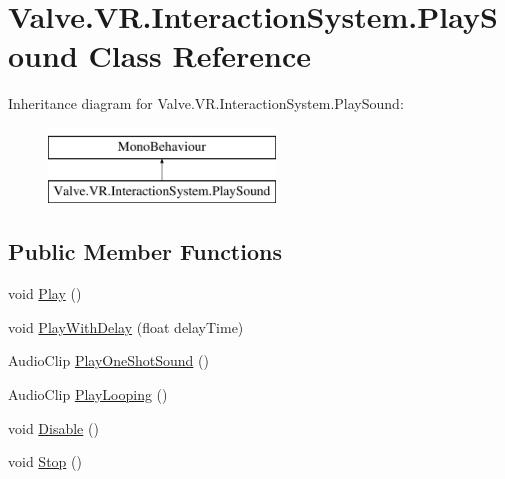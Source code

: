 \hypertarget{class_valve_1_1_v_r_1_1_interaction_system_1_1_play_sound}{}\section{Valve.\+V\+R.\+Interaction\+System.\+Play\+Sound Class Reference}
\label{class_valve_1_1_v_r_1_1_interaction_system_1_1_play_sound}
Inheritance diagram for Valve.\+V\+R.\+Interaction\+System.\+Play\+Sound\+:\begin{figure}[H]
\begin{center}
\leavevmode
\includegraphics[height=2.000000cm]{class_valve_1_1_v_r_1_1_interaction_system_1_1_play_sound}
\end{center}
\end{figure}
\subsection*{Public Member Functions}
\begin{DoxyCompactItemize}
\item 
void \mbox{\hyperlink{class_valve_1_1_v_r_1_1_interaction_system_1_1_play_sound_a90203c161ab7b4151ee3cc5bb3d4dde4}{Play}} ()
\item 
void \mbox{\hyperlink{class_valve_1_1_v_r_1_1_interaction_system_1_1_play_sound_a63a5229219f93d4e2e332ea47e5ba747}{Play\+With\+Delay}} (float delay\+Time)
\item 
Audio\+Clip \mbox{\hyperlink{class_valve_1_1_v_r_1_1_interaction_system_1_1_play_sound_ac8a86c9eb4f69163eb7774b0feeff399}{Play\+One\+Shot\+Sound}} ()
\item 
Audio\+Clip \mbox{\hyperlink{class_valve_1_1_v_r_1_1_interaction_system_1_1_play_sound_abaeb5213c952d970b00917d16c8bc9a5}{Play\+Looping}} ()
\item 
void \mbox{\hyperlink{class_valve_1_1_v_r_1_1_interaction_system_1_1_play_sound_ad0590ec5a8c346142b7ada429f08e590}{Disable}} ()
\item 
void \mbox{\hyperlink{class_valve_1_1_v_r_1_1_interaction_system_1_1_play_sound_a52ca736a68f31cc3459791070fd5f3f0}{Stop}} ()
\end{DoxyCompactItemize}
